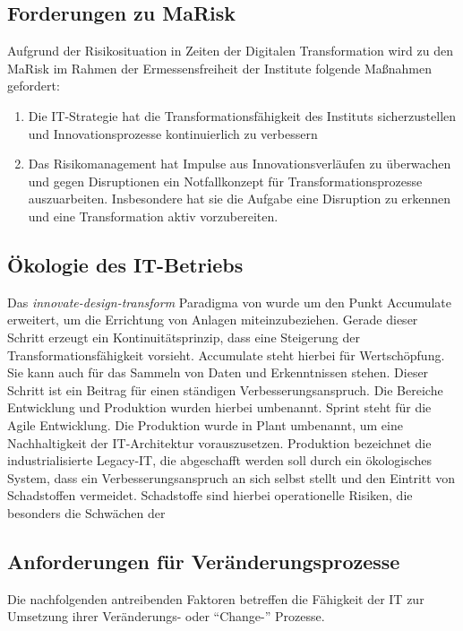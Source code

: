 \subsection{Forderungen zu MaRisk}
Aufgrund der Risikosituation in Zeiten der Digitalen Transformation wird zu den \ac{MaRisk} \cite{MaRisk:2017} im Rahmen der Ermessensfreiheit der Institute folgende Maßnahmen gefordert:
\begin{enumerate}
    \item Die IT-Strategie hat die Transformationsfähigkeit des Instituts sicherzustellen und Innovationsprozesse kontinuierlich zu verbessern
    \item Das Risikomanagement hat Impulse aus Innovationsverläufen zu überwachen und gegen Disruptionen ein Notfallkonzept für Transformationsprozesse auszuarbeiten. Insbesondere hat sie die Aufgabe eine Disruption zu erkennen und eine Transformation aktiv vorzubereiten.
\end{enumerate}

\subsection{Ökologie des IT-Betriebs}
Das \emph{innovate-design-transform} Paradigma von \citet{Koch2016} wurde um den Punkt Accumulate erweitert, um die Errichtung von Anlagen \cite{Ganswindt2006} miteinzubeziehen. Gerade dieser Schritt erzeugt ein Kontinuitätsprinzip, dass eine Steigerung der Transformationsfähigkeit vorsieht. Accumulate steht hierbei für Wertschöpfung. Sie kann auch für das Sammeln von Daten und Erkenntnissen stehen. Dieser Schritt ist ein Beitrag für einen ständigen Verbesserungsanspruch. Die Bereiche Entwicklung und Produktion wurden hierbei umbenannt. Sprint steht für die Agile Entwicklung. Die Produktion wurde in Plant umbenannt, um eine Nachhaltigkeit der IT-Architektur vorauszusetzen. Produktion bezeichnet die industrialisierte Legacy-IT, die abgeschafft werden soll durch ein ökologisches System, dass ein Verbesserungsanspruch an sich selbst stellt und den Eintritt von Schadstoffen vermeidet. Schadstoffe sind hierbei operationelle Risiken, die besonders die Schwächen der 

\subsection{Anforderungen für Veränderungsprozesse}
Die nachfolgenden antreibenden Faktoren betreffen die Fähigkeit der IT zur Umsetzung ihrer Veränderungs- oder \enquote{Change-} Prozesse.

